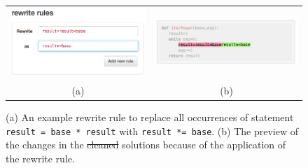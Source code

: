 \documentclass[12pt,twoside]{mitthesis}
\newcommand \codevar[1]{\texttt{#1}}
\providecommand{\DIFaddtex}[1]{{\protect\color{blue}\uwave{#1}}} %
\providecommand{\DIFdeltex}[1]{{\protect\color{red}\sout{#1}}}                      %
\providecommand{\DIFaddFL}[1]{\DIFadd{#1}} %
\providecommand{\DIFdelFL}[1]{\DIFdel{#1}} %
\providecommand{\DIFaddbeginFL}{} %
\providecommand{\DIFaddendFL}{} %
\providecommand{\DIFdelbeginFL}{} %
\providecommand{\DIFdelendFL}{} %
\providecommand{\DIFadd}[1]{\texorpdfstring{\DIFaddtex{#1}}{#1}} %
\providecommand{\DIFdel}[1]{\texorpdfstring{\DIFdeltex{#1}}{}} %
\begin{document}
\begin{figure}[htpb]
\begin{tabular}{c | c}
\begin{minipage}{.5\linewidth}
\centering
\includegraphics[scale=0.45]{Body/figures/overcode/rewriteRuleScreenshot.png}
\end{minipage}
&
\begin{minipage}{.5\linewidth}
\centering
\includegraphics[scale=0.40]{Body/figures/overcode/rewritePreviewScreenShot.png}
\end{minipage}
\\
(a) & (b)
\end{tabular}
\caption{(a) An example rewrite rule to replace all occurrences of statement \codevar{result = base * result} with \codevar{result *= base}. (b) The preview of the changes in the \DIFdelbeginFL \DIFdelFL{cleaned }\DIFdelendFL \DIFaddbeginFL \DIFaddFL{platonic }\DIFaddendFL solutions because of the application of the rewrite rule.}
\label{rewriterule}
\end{figure}
\end{document}
